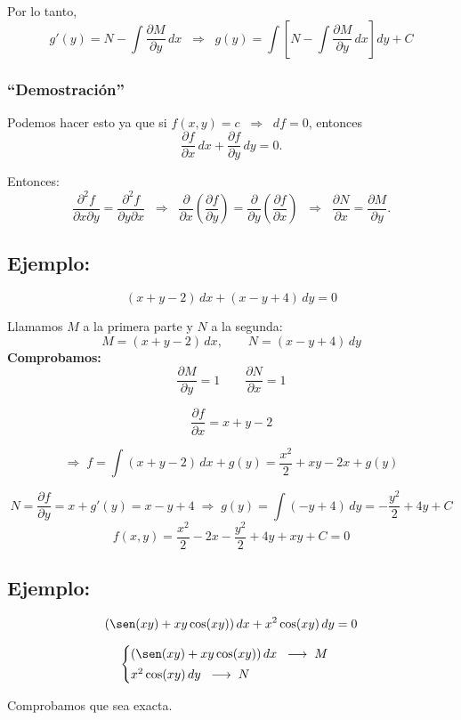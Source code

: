 \documentclass[a4paper,12pt]{article}
\begin{document}
Por lo tanto,
\[
g'(y) = N - \int \frac{\partial M}{\partial y}\,dx 
\;\;\Rightarrow\;\;
g(y) = \int\left[N - \int \frac{\partial M}{\partial y}\,dx\right]dy + C
\]

\subsubsection*{“Demostración”}

Podemos hacer esto ya que si $f(x,y)=c \;\;\Rightarrow\;\; df=0$,  
entonces
\[
\frac{\partial f}{\partial x}\,dx + \frac{\partial f}{\partial y}\,dy = 0.
\]

Entonces:
\[
\frac{\partial^2 f}{\partial x \partial y} = \frac{\partial^2 f}{\partial y \partial x}
\;\;\Rightarrow\;\;
\frac{\partial}{\partial x}\!\left(\frac{\partial f}{\partial y}\right)
= \frac{\partial}{\partial y}\!\left(\frac{\partial f}{\partial x}\right)
\;\;\Rightarrow\;\;
\frac{\partial N}{\partial x} = \frac{\partial M}{\partial y}.
\]
\subsection*{Ejemplo:}

\[
(x+y-2)\,dx + (x-y+4)\,dy = 0
\]

Llamamos \(M\) a la primera parte y \(N\) a la segunda:
\[
M=(x+y-2)\,dx, \qquad N=(x-y+4)\,dy
\]
\newpage
\textbf{Comprobamos:}
\[
\frac{\partial M}{\partial y}=1  
\qquad 
\frac{\partial N}{\partial x}=1
\]

\[
\frac{\partial f}{\partial x}=x+y-2
\]

\[
\Rightarrow\;
f=\int (x+y-2)\,dx + g(y)
= \frac{x^{2}}{2}+xy-2x+g(y)
\]

\[
N=\frac{\partial f}{\partial y}=x+g'(y)=x-y+4
\;\Rightarrow\;
g(y)=\int(-y+4)\,dy=-\frac{y^{2}}{2}+4y+C
\]
\[
f(x,y)=\frac{x^{2}}{2}-2x-\frac{y^{2}}{2}+4y+xy+C=0
\]

\subsection*{Ejemplo:}

\[
(\sen(xy)+xy\cos(xy))\,dx+x^{2}\cos(xy)\,dy=0
\]

\[
\begin{cases}
(\sen(xy)+xy\cos(xy))\,dx \;\;\longrightarrow\; M\\[2pt]
x^{2}\cos(xy)\,dy \;\;\longrightarrow\; N
\end{cases}
\]

Comprobamos que sea exacta.
\end{document}
